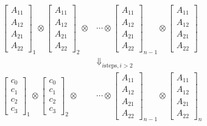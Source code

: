 \documentclass[twocolumn]{article}
\begin{document}
\begin{eqnarray}
    &\begin{bmatrix}
        A_{11} \\
        A_{12} \\
        A_{21} \\
        A_{22}
    \end{bmatrix}_1 \otimes
    \begin{bmatrix}
        A_{11} \\
        A_{12} \\
        A_{21} \\
        A_{22}
    \end{bmatrix}_2 \otimes
    &\cdots \otimes
    \begin{bmatrix}
        A_{11} \\
        A_{12} \\
        A_{21} \\
        A_{22}
    \end{bmatrix}_{n-1} \otimes
    \begin{bmatrix}
        A_{11} \\
        A_{12} \\
        A_{21} \\
        A_{22}
    \end{bmatrix}
    \nonumber\\
    & &\Downarrow_{i \text{steps}, i>2} \label{eq:vec_tpd}\\
    &\begin{bmatrix}
        c_0\\
        c_1\\
        c_2\\
        c_3
    \end{bmatrix}_1 \otimes
    \begin{bmatrix}
        c_0\\
        c_1\\
        c_2\\
        c_3
    \end{bmatrix}_2 \otimes
    &\cdots \otimes
    \begin{bmatrix}
        A_{11} \\
        A_{12} \\
        A_{21} \\
        A_{22}
    \end{bmatrix}_{n-1} \otimes
    \begin{bmatrix}
        A_{11} \\
        A_{12} \\
        A_{21} \\
        A_{22}
    \end{bmatrix}_n\nonumber
\end{eqnarray}
\end{document}
